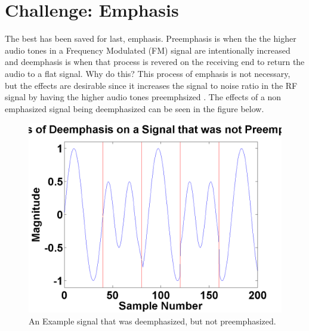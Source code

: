 \section{Challenge: Emphasis}
The best has been saved for last, emphasis. Preemphasis is when the the higher audio tones in a Frequency Modulated (FM) signal are intentionally increased and deemphasis is when that process is revered on the receiving end to return the audio to a flat signal. Why do this? This process of emphasis is not necessary, but the effects are desirable since it increases the signal to noise ratio in the RF signal by having the higher audio tones preemphsized \cite{Gibilisco1994}. The effects of a non emphasized signal being deemphasized can be seen in the figure below.
\begin{figure}
  \centering
	\includegraphics[width=0.75\linewidth]{images/EffectsofDeemphasisonaSignalthatwasnotpreemphasized.png} 
	\caption{An Example signal that was deemphasized, but not preemphasized.}
\end{figure}
